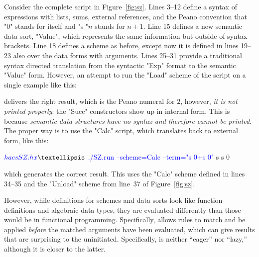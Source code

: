 \documentclass[12pt]{article} %
\begin{document}
\begin{example}
  Consider the complete \HAX script in Figure~\ref{fig:sz}. Lines 3--12 define a syntax of
  expressions with lists, sums, external references, and the Peano convention that "0" stands for
  itself and "s "$n$ stands for $n+1$. Line 15 defines a new semantic data sort, "Value", which
  represents the same information but outside of syntax brackets. Line 18 defines a scheme as
  before, except now it is defined in lines 19--23 also over the data forms with arguments. Lines
  25--31 provide a traditional syntax directed translation from the syntactic "Exp" format to the
  semantic "Value" form. However, an attempt to run the "Load" scheme of the script on a single
  example like this:
  delivers the right result, which is the Peano numeral for $2$,
  however, \emph{it is not printed properly}: the "Succ" constructors show up in internal form. This
  is because \emph{semantic data structures have no syntax and therefore cannot be printed}. The
  proper way is to use the "Calc" script, which translates back to external form, like this:
  \begin{code}[commandchars=\\\{\}]
$ \textcolor{blue}{hacs SZ.hx}
…
$ \textcolor{blue}{./SZ.run --scheme=Calc --term="s 0+s 0"}
 s  s  0   
  \end{code}
  which generates the correct result. This uses the "Calc" scheme defined in lines 34--35 and the
  "Unload" scheme from line~37 of Figure~\ref{fig:sz}.
\end{example}

However, while \HAX definitions for schemes and data sorts look like function definitions and
algebraic data types, they are evaluated differently than those would be in functional programming.
Specifically, \HAX allows rules to match and be applied \emph{before} the matched arguments have
been evaluated, which can give results that are surprising to the uninitiated. Specifically, \HAX is
neither ``eager'' nor ``lazy,'' although it is closer to the latter.
\end{document}
